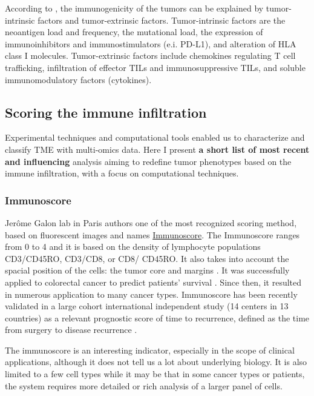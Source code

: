 \documentclass[12pt,]{book}
\theoremstyle{definition}
\theoremstyle{definition}
\theoremstyle{definition}
\theoremstyle{remark}
\begin{document}
According to \citet{Gajewski2006}, the immunogenicity of the tumors can
be explained by tumor-intrinsic factors and tumor-extrinsic factors.
Tumor-intrinsic factors are the neoantigen load and frequency, the
mutational load, the expression of immunoinhibitors and
immunostimulators (e.i. PD-L1), and alteration of HLA class I molecules.
Tumor-extrinsic factors include chemokines regulating T cell
trafficking, infiltration of effector TILs and immunosuppressive TILs,
and soluble immunomodulatory factors (cytokines).

\hypertarget{scoring-the-immune-infiltration}{%
\subsection{Scoring the immune
infiltration}\label{scoring-the-immune-infiltration}}

Experimental techniques and computational tools enabled us to
characterize and classify TME with multi-omics data. Here I present
\textbf{a short list of most recent and influencing} analysis aiming to
redefine tumor phenotypes based on the immune infiltration, with a focus
on computational techniques.

\hypertarget{immunoscore}{%
\subsubsection{Immunoscore}\label{immunoscore}}

Jerôme Galon lab in Paris authors one of the most recognized scoring
method, based on fluorescent images and names
\href{http://www.haliodx.com/clinical-research-services/immunoscorer/}{Immunoscore}.
The Immunoscore ranges from 0 to 4 and it is based on the density of
lymphocyte populations CD3/CD45RO, CD3/CD8, or CD8/ CD45RO. It also
takes into account the spacial position of the cells: the tumor core and
margins \citep{Galon2012}. It was successfully applied to colorectal
cancer to predict patients' survival \citep{Anitei2014}. Since then, it
resulted in numerous application to many cancer types. Immunoscore has
been recently validated in a large cohort international independent
study (14 centers in 13 countries) as a relevant prognostic score of
time to recurrence, defined as the time from surgery to disease
recurrence \citep{Pages2018}.

The immunoscore is an interesting indicator, especially in the scope of
clinical applications, although it does not tell us a lot about
underlying biology. It is also limited to a few cell types while it may
be that in some cancer types or patients, the system requires more
detailed or rich analysis of a larger panel of cells.
\end{document}
